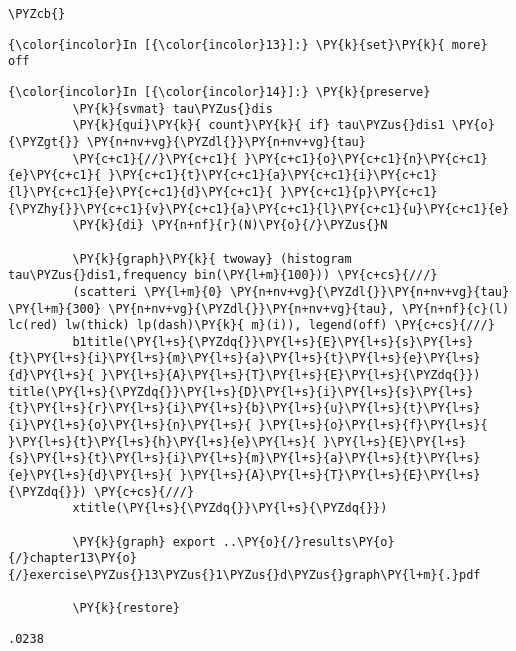 \documentclass[11pt,notitlepage]{article}\usepackage[]{graphicx}\usepackage[]{color}
\makeatletter
\newenvironment{kframe}{%
 \def\at@end@of@kframe{}%
 \ifinner\ifhmode%
  \def\at@end@of@kframe{\end{minipage}}%
  \begin{minipage}{\columnwidth}%
 \fi\fi%
 \def\FrameCommand##1{\hskip\@totalleftmargin \hskip-\fboxsep
 \colorbox{shadecolor}{##1}\hskip-\fboxsep
     \hskip-\linewidth \hskip-\@totalleftmargin \hskip\columnwidth}%
 \MakeFramed {\advance\hsize-\width
   \@totalleftmargin\z@ \linewidth\hsize
   \@setminipage}}%
 {\par\unskip\endMakeFramed%
 \at@end@of@kframe}
\newenvironment{knitrout}{}{} %
\makeatother
\begin{document}
\begin{enumerate}[a)]
\begin{knitrout}
\begin{kframe}
\begin{Verbatim}[commandchars=\\\{\}]
         \PYZcb{}
\end{Verbatim}

    \begin{Verbatim}[commandchars=\\\{\}]
{\color{incolor}In [{\color{incolor}13}]:} \PY{k}{set}\PY{k}{ more} off
\end{Verbatim}

    \begin{Verbatim}[commandchars=\\\{\}]
{\color{incolor}In [{\color{incolor}14}]:} \PY{k}{preserve}
         \PY{k}{svmat} tau\PYZus{}dis
         \PY{k}{qui}\PY{k}{ count}\PY{k}{ if} tau\PYZus{}dis1 \PY{o}{\PYZgt{}} \PY{n+nv+vg}{\PYZdl{}}\PY{n+nv+vg}{tau}
         \PY{c+c1}{//}\PY{c+c1}{ }\PY{c+c1}{o}\PY{c+c1}{n}\PY{c+c1}{e}\PY{c+c1}{ }\PY{c+c1}{t}\PY{c+c1}{a}\PY{c+c1}{i}\PY{c+c1}{l}\PY{c+c1}{e}\PY{c+c1}{d}\PY{c+c1}{ }\PY{c+c1}{p}\PY{c+c1}{\PYZhy{}}\PY{c+c1}{v}\PY{c+c1}{a}\PY{c+c1}{l}\PY{c+c1}{u}\PY{c+c1}{e}
         \PY{k}{di} \PY{n+nf}{r}(N)\PY{o}{/}\PYZus{}N
         
         \PY{k}{graph}\PY{k}{ twoway} (histogram tau\PYZus{}dis1,frequency bin(\PY{l+m}{100})) \PY{c+cs}{///}
         (scatteri \PY{l+m}{0} \PY{n+nv+vg}{\PYZdl{}}\PY{n+nv+vg}{tau} \PY{l+m}{300} \PY{n+nv+vg}{\PYZdl{}}\PY{n+nv+vg}{tau}, \PY{n+nf}{c}(l) lc(red) lw(thick) lp(dash)\PY{k}{ m}(i)), legend(off) \PY{c+cs}{///}
         b1title(\PY{l+s}{\PYZdq{}}\PY{l+s}{E}\PY{l+s}{s}\PY{l+s}{t}\PY{l+s}{i}\PY{l+s}{m}\PY{l+s}{a}\PY{l+s}{t}\PY{l+s}{e}\PY{l+s}{d}\PY{l+s}{ }\PY{l+s}{A}\PY{l+s}{T}\PY{l+s}{E}\PY{l+s}{\PYZdq{}}) title(\PY{l+s}{\PYZdq{}}\PY{l+s}{D}\PY{l+s}{i}\PY{l+s}{s}\PY{l+s}{t}\PY{l+s}{r}\PY{l+s}{i}\PY{l+s}{b}\PY{l+s}{u}\PY{l+s}{t}\PY{l+s}{i}\PY{l+s}{o}\PY{l+s}{n}\PY{l+s}{ }\PY{l+s}{o}\PY{l+s}{f}\PY{l+s}{ }\PY{l+s}{t}\PY{l+s}{h}\PY{l+s}{e}\PY{l+s}{ }\PY{l+s}{E}\PY{l+s}{s}\PY{l+s}{t}\PY{l+s}{i}\PY{l+s}{m}\PY{l+s}{a}\PY{l+s}{t}\PY{l+s}{e}\PY{l+s}{d}\PY{l+s}{ }\PY{l+s}{A}\PY{l+s}{T}\PY{l+s}{E}\PY{l+s}{\PYZdq{}}) \PY{c+cs}{///}
         xtitle(\PY{l+s}{\PYZdq{}}\PY{l+s}{\PYZdq{}}) 
         
         \PY{k}{graph} export ..\PY{o}{/}results\PY{o}{/}chapter13\PY{o}{/}exercise\PYZus{}13\PYZus{}1\PYZus{}d\PYZus{}graph\PY{l+m}{.}pdf	
         
         \PY{k}{restore}
\end{Verbatim}

    \begin{Verbatim}[commandchars=\\\{\}]
.0238


\end{Verbatim}
\end{kframe}
\end{knitrout}
\end{enumerate}
\end{document}
